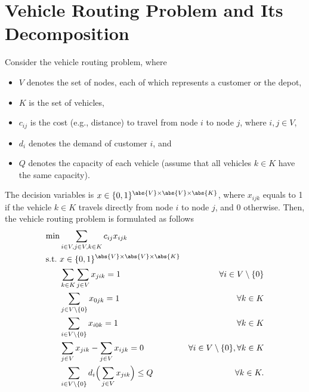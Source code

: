 \appendix

\onecolumn

\section{Vehicle Routing Problem and Its Decomposition} \label{apx:vhr-decomposition}
Consider the vehicle routing problem, where 
\begin{itemize}
    \item $V$ denotes the set of nodes, each of which represents a customer or the depot,  
    \item $K$ is the set of vehicles,
    \item $c_{ij}$ is the cost (e.g., distance) to travel from node $i$ to node $j$, where $i, j \in V$,
    \item $d_i$ denotes the demand of customer $i$, and
    \item $Q$ denotes the capacity of each vehicle (assume that all vehicles $k \in K$ have the same capacity).
\end{itemize}
The decision variables is $x \in \{0, 1\}^{\abs{V} \times \abs{V} \times \abs{K}}$, where $x_{ijk}$ equals to 1 if the vehicle $k \in K$ travels directly from node $i$ to node $j$, and 0 otherwise. Then, the vehicle routing problem is formulated as follows
\begin{subequations}
    \begin{align}
    \min & \displaystyle \sum_{i\in V, j\in V, k \in K} c_{ij}x_{ijk} \notag \\
        \mathrm{s.t.~} & x \in \{0, 1\}^{\abs{V} \times \abs{V} \times \abs{K}} \\
        & \displaystyle \sum_{k \in K} \sum_{j \in V} x_{jik} = 1 & \forall i\in V \setminus \{0\} \label{eq:vrp-linking}\\
        & \displaystyle \sum_{j \in V\setminus\{0\}}x_{0jk} = 1 & \forall k \in K \label{eq:vrp-preservation1}\\
        & \displaystyle \sum_{i \in V \setminus \{0\}} x_{i0k} = 1 &\forall  k \in K \label{eq:vrp-preservation2}\\
        & \displaystyle \sum_{j \in V} x_{jik} - \sum_{j \in V} x_{ijk} = 0 & \forall i\in V \setminus \{0\}, \forall k \in K \label{eq:vrp-flow-conservation}\\
        & \displaystyle \sum_{i \in V \setminus \{0\}} d_i \Big(\sum_{j \in V} x_{jik}\Big) \leq Q & \forall k \in K . \label{eq:vrp-capacity-restriction}
    \end{align}
\end{subequations}
